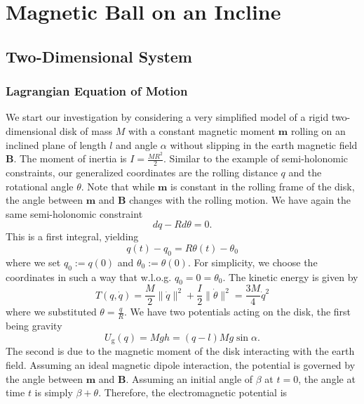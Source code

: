 \chapter{Magnetic Ball on an Incline}
\label{chap:incline}
\vspace*{-0.9cm}


\section{Two-Dimensional System}
\label{sec:twodim}
\subsection*{Lagrangian Equation of Motion}
We start our investigation by considering a very simplified model of a rigid two-dimensional disk of mass $M$ with a constant magnetic moment $\mathbf{m}$ rolling on an inclined plane of length $l$ and angle $\alpha$ without slipping in the earth magnetic field $\mathbf{B}$. The moment of inertia is $I=\frac{MR^2}{2}$. Similar to the example of semi-holonomic constraints, our generalized coordinates are the rolling distance $q$ and the rotational angle $\theta$. Note that while $\mathbf{m}$ is constant in the rolling frame of the disk, the angle between $\mathbf{m}$ and $\mathbf{B}$ changes with the rolling motion. We have again the same semi-holonomic constraint 
\[
dq-Rd\theta = 0
.\] This is a first integral, yielding \[
q(t) - q_0= R\theta(t) - \theta_0 
\] where we set $q_0:=q(0)$ and $\theta_0 := \theta(0)$. For simplicity, we choose the coordinates in such a way that w.l.o.g. $q_0=0=\theta_0$. The kinetic energy is given by
\[
    T(q, \dot{q}) = \frac{M}{2} \|\dot{q}\|^2 + \frac{I}{2} \|\dot{\theta}\|^2 = \frac{3M}{4} \dot{q}^2
\] where we substituted $\theta = \frac{q}{R}$. We have two potentials acting on the disk, the first being gravity
\[
    U_\text{g}(q) = Mgh = (q-l)Mg \sin \alpha
.\] The second is due to the magnetic moment of the disk interacting with the earth field. Assuming an ideal magnetic dipole interaction, the potential is governed by the angle between $\mathbf{m}$ and $\mathbf{B}$. 
Assuming an initial angle of $\beta$ at $t=0$, the angle at time $t$ is simply $\beta + \theta$. Therefore, the electromagnetic potential is

